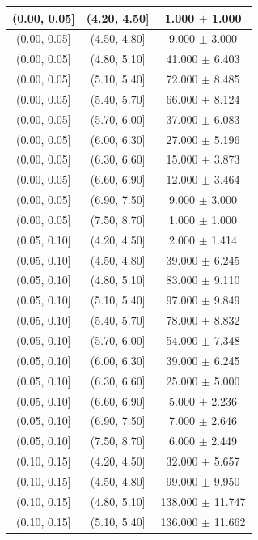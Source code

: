 \begin{longtable}{|c|c|c|}
\hline
\endlastfoot
(0.00, 0.05] & (4.20, 4.50] & 1.000 $\pm$ 1.000 \\ 
\hline
(0.00, 0.05] & (4.50, 4.80] & 9.000 $\pm$ 3.000 \\ 
\hline
(0.00, 0.05] & (4.80, 5.10] & 41.000 $\pm$ 6.403 \\ 
\hline
(0.00, 0.05] & (5.10, 5.40] & 72.000 $\pm$ 8.485 \\ 
\hline
(0.00, 0.05] & (5.40, 5.70] & 66.000 $\pm$ 8.124 \\ 
\hline
(0.00, 0.05] & (5.70, 6.00] & 37.000 $\pm$ 6.083 \\ 
\hline
(0.00, 0.05] & (6.00, 6.30] & 27.000 $\pm$ 5.196 \\ 
\hline
(0.00, 0.05] & (6.30, 6.60] & 15.000 $\pm$ 3.873 \\ 
\hline
(0.00, 0.05] & (6.60, 6.90] & 12.000 $\pm$ 3.464 \\ 
\hline
(0.00, 0.05] & (6.90, 7.50] & 9.000 $\pm$ 3.000 \\ 
\hline
(0.00, 0.05] & (7.50, 8.70] & 1.000 $\pm$ 1.000 \\ 
\hline
(0.05, 0.10] & (4.20, 4.50] & 2.000 $\pm$ 1.414 \\ 
\hline
(0.05, 0.10] & (4.50, 4.80] & 39.000 $\pm$ 6.245 \\ 
\hline
(0.05, 0.10] & (4.80, 5.10] & 83.000 $\pm$ 9.110 \\ 
\hline
(0.05, 0.10] & (5.10, 5.40] & 97.000 $\pm$ 9.849 \\ 
\hline
(0.05, 0.10] & (5.40, 5.70] & 78.000 $\pm$ 8.832 \\ 
\hline
(0.05, 0.10] & (5.70, 6.00] & 54.000 $\pm$ 7.348 \\ 
\hline
(0.05, 0.10] & (6.00, 6.30] & 39.000 $\pm$ 6.245 \\ 
\hline
(0.05, 0.10] & (6.30, 6.60] & 25.000 $\pm$ 5.000 \\ 
\hline
(0.05, 0.10] & (6.60, 6.90] & 5.000 $\pm$ 2.236 \\ 
\hline
(0.05, 0.10] & (6.90, 7.50] & 7.000 $\pm$ 2.646 \\ 
\hline
(0.05, 0.10] & (7.50, 8.70] & 6.000 $\pm$ 2.449 \\ 
\hline
(0.10, 0.15] & (4.20, 4.50] & 32.000 $\pm$ 5.657 \\ 
\hline
(0.10, 0.15] & (4.50, 4.80] & 99.000 $\pm$ 9.950 \\ 
\hline
(0.10, 0.15] & (4.80, 5.10] & 138.000 $\pm$ 11.747 \\ 
\hline
(0.10, 0.15] & (5.10, 5.40] & 136.000 $\pm$ 11.662 \\ 

\end{longtable}
